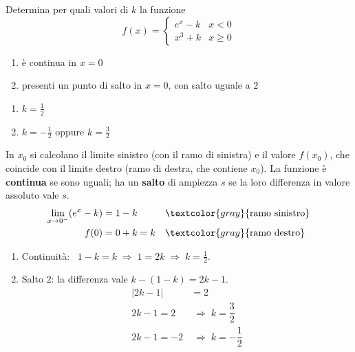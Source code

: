 \begin{question}[ID=4.1, subtitle={Continuità e salto di $f$ con $e^x-k$ e $x^3+k$ in $x=0$}, tags={continuità, parametrico}, difficulty=media]
Determina per quali valori di $k$ la funzione
\[
f(x) = \begin{cases}
    e^x - k & x < 0 \\
    x^3+k & x \ge 0
\end{cases}
\]
\begin{enumerate}
\item è continua in $x=0$
\item presenti un punto di salto in $x=0$, con salto uguale a $2$
\end{enumerate}
\begin{solution}
\begin{enumerate}
    \item $k=\tfrac12$
    \item $k=-\tfrac12$ oppure $k=\tfrac32$
\end{enumerate}
\end{solution}
\begin{explanation}
In $x_0$ si calcolano il limite sinistro (con il ramo di sinistra) e il valore $f(x_0)$, che coincide con il limite destro (ramo di destra, che contiene $x_0$). La funzione è \textbf{continua} se sono uguali; ha un \textbf{salto} di ampiezza $s$ se la loro differenza in valore assoluto vale $s$.
\[\begin{aligned}
\lim_{x\to0^-}(e^x-k) &= 1-k && \textcolor{gray}{\text{ramo sinistro}}\\
f(0) &= 0+k=k && \textcolor{gray}{\text{ramo destro}}
\end{aligned}\]
\begin{enumerate}
    \item Continuità: \ $1-k=k \;\Rightarrow\; 1=2k \;\Rightarrow\; k=\tfrac12$.
    \item Salto $2$: la differenza vale $k-(1-k)=2k-1$.
    \[\begin{aligned}
    |2k-1| &= 2\\
    2k-1=2 &\;\Rightarrow\; k=\dfrac32\\
    2k-1=-2 &\;\Rightarrow\; k=-\dfrac12
    \end{aligned}\]
\end{enumerate}
\end{explanation}
\end{question}


